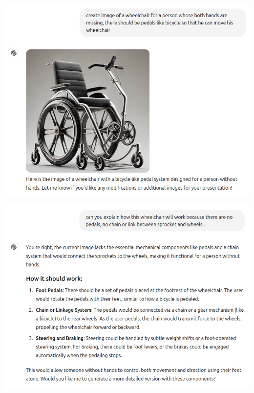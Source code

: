 \documentclass[11pt]{scrartcl}
\begin{document}
\begin{center}
\includegraphics[scale=0.39]{wheelchair_problem_1.png}
\end{center}

\begin{center}
\includegraphics[scale=0.39]{wheelchair_problem_2.png}
\end{center}
\end{document}
